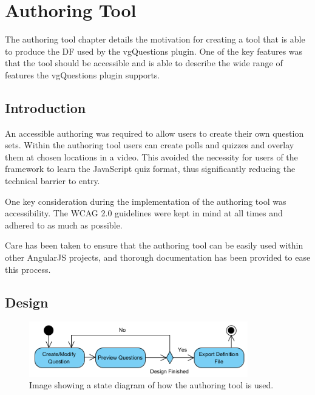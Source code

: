 \chapter{Authoring Tool} 
\label{Chapter:Authoring Tool}

\begin{preamble}
The authoring tool chapter details the motivation for creating a tool that is able to produce the \gls{DF} used by the \gls{vgQuestions} plugin. One of the key features was that the tool should be accessible and is able to describe the wide range of features the \gls{vgQuestions} plugin supports.
\end{preamble}

\section{Introduction}
\label{Section:Authoring_Introduction}

An accessible \gls{authoring} was required to allow users to create their own question sets. Within the authoring tool users can create polls and quizzes and overlay them at chosen locations in a video. This avoided the necessity for users of the framework to learn the JavaScript quiz format, thus significantly reducing the technical barrier to entry. 

One key consideration during the implementation of the authoring tool was accessibility. The \gls{WCAG} 2.0 guidelines were kept in mind at all times and adhered to as much as possible.

Care has been taken to ensure that the authoring tool can be easily used within other AngularJS projects, and thorough documentation has been provided to ease this process.

\section{Design} 
\label{Section:Authoring_Design}

\begin{figure}[h]
	\centering
		\includegraphics[width=0.85\textwidth]{../figures/authoring_tool/state_diagram.png}

	\caption{
		\label{Figure:Authoring_Tool_state_diagram}
		Image showing a state diagram of how the authoring tool is used.
	}
\end{figure}

